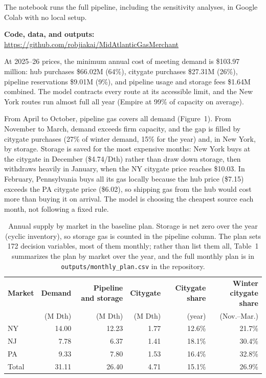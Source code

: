 \documentclass[11pt]{article}
\newcommand{\head}[1]{\needspace{5\baselineskip}\vspace{0.5em}\noindent{\large\bfseries\color{navy}\uline{#1}}\par\vspace{0.15em}}
\newcommand{\runin}[1]{{\bfseries\color{navy}#1}\enspace}
\begin{document}
\noindent The notebook runs the full pipeline, including the sensitivity analyses, in Google Colab with
no local setup.

\smallskip
\noindent\textbf{Code, data, and outputs:}
\url{https://github.com/robjiakai/MidAtlanticGasMerchant}

\head{Baseline Results}
At 2025--26 prices, the minimum annual cost of meeting demand is \$103.97 million: hub purchases
\$66.02M (64\%), citygate purchases \$27.31M (26\%), pipeline reservations \$9.01M (9\%), and pipeline
usage and storage fees \$1.64M combined. The model contracts every route at its accessible limit, and
the New York routes run almost full all year (Empire at 99\% of capacity on average).

\smallskip
\noindent\runin{How demand is met.} From April to October, pipeline gas covers all demand
(Figure~1). From November to March, demand exceeds firm capacity, and the gap is filled by citygate
purchases (27\% of winter demand, 15\% for the year) and, in New York, by storage. Storage is saved for
the most expensive months: New York buys at the citygate in December (\$4.74/Dth) rather than draw down
storage, then withdraws heavily in January, when the NY citygate price reaches \$10.03. In February,
Pennsylvania buys all its gas locally because the hub price (\$7.15) exceeds the PA citygate price
(\$6.02), so shipping gas from the hub would cost more than buying it on arrival. The model is
choosing the cheapest source each month, not following a fixed rule.

\begin{table}[h!]
\centering
\small
\begin{tabular}{@{}lrrrrr@{}}
\hline
\textbf{Market} & \textbf{Demand} & \textbf{Pipeline and storage} & \textbf{Citygate} & \textbf{Citygate share} & \textbf{Winter citygate share} \\
 & (M Dth) & (M Dth) & (M Dth) & (year) & (Nov.--Mar.) \\
\hline
NY    & 14.00 & 12.23 & 1.77 & 12.6\% & 21.7\% \\
NJ    &  7.78 &  6.37 & 1.41 & 18.1\% & 30.4\% \\
PA    &  9.33 &  7.80 & 1.53 & 16.4\% & 32.8\% \\
\hline
Total & 31.11 & 26.40 & 4.71 & 15.1\% & 26.9\% \\
\hline
\end{tabular}
\caption{Annual supply by market in the baseline plan. Storage is net zero over the year (cyclic inventory), so storage gas is counted in the pipeline column. The plan sets 172 decision variables, most of them monthly; rather than list them all, Table~1 summarizes the plan by market over the year, and the full monthly plan is in \texttt{outputs/monthly\_plan.csv} in the repository.}
\end{table}
\end{document}
